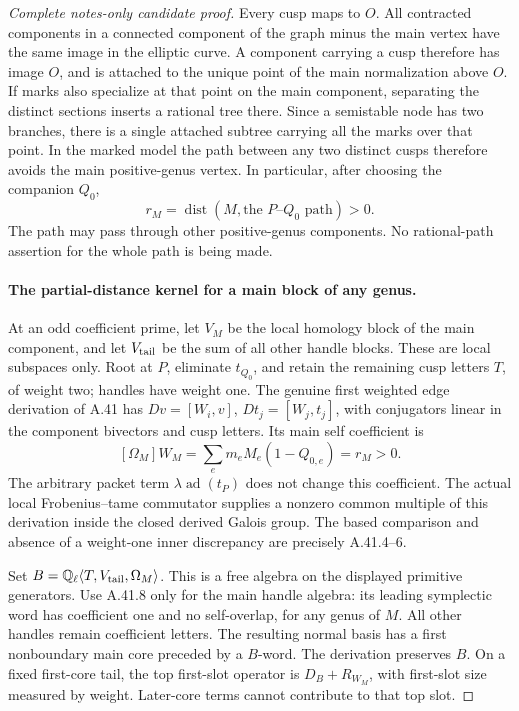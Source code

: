 \begin{proof}[Complete notes-only candidate proof]
Every cusp maps to \(O\). All contracted components in a connected
component of the graph minus the main vertex have the same image
in the elliptic curve. A component carrying a cusp therefore has
image \(O\), and is attached to the unique point of the main
normalization above \(O\). If marks also specialize at that point
on the main component, separating the distinct sections inserts
a rational tree there. Since a semistable node has two branches,
there is a single attached subtree carrying all the marks over
that point. In the marked model the path between any two distinct
cusps therefore avoids the main positive-genus vertex. In
particular, after choosing the companion \(Q_0\),
\[
 r_M=\operatorname{dist}(M,\text{the }P\text{--}Q_0
                              \text{ path})>0.         \tag{FW.15}
\]
The path may pass through other positive-genus components. No
rational-path assertion for the whole path is being made.

\paragraph{The partial-distance kernel for a main block of any genus.}
At an odd coefficient prime, let \(V_M\) be the local homology
block of the main component, and let \(V_{\rm tail}\) be the
sum of all other handle blocks. These are local subspaces only.
Root at \(P\), eliminate \(t_{Q_0}\), and retain the remaining
cusp letters \(T\), of weight two; handles have weight one.
The genuine first weighted edge derivation of A.41 has
\(Dv=[W_i,v]\), \(Dt_j=[W_j,t_j]\), with conjugators linear
in the component bivectors and cusp letters. Its main self
coefficient is
\[
            [\Omega_M]W_M
              =\sum_e m_e M_e(1-Q_{0,e})=r_M>0.       \tag{FW.16}
\]
The arbitrary packet term \(\lambda\operatorname{ad}(t_P)\)
does not change this coefficient. The actual local Frobenius--tame
commutator supplies a nonzero common multiple of this derivation
inside the closed derived Galois group. The based comparison and
absence of a weight-one inner discrepancy are precisely A.41.4--6.

Set \(B=\mathbb Q_\ell\langle T,V_{\rm tail},\Omega_M\rangle\).
This is a free algebra on the displayed primitive generators.
Use A.41.8 only for the main handle algebra: its leading
symplectic word has coefficient one and no self-overlap, for
any genus of \(M\). All other handles remain coefficient letters.
The resulting normal basis has a first nonboundary main core
preceded by a \(B\)-word. The derivation preserves \(B\).
On a fixed first-core tail, the top first-slot operator is
\(D_B+R_{W_M}\), with first-slot size measured by weight.
Later-core terms cannot contribute to that top slot.


\end{proof}
